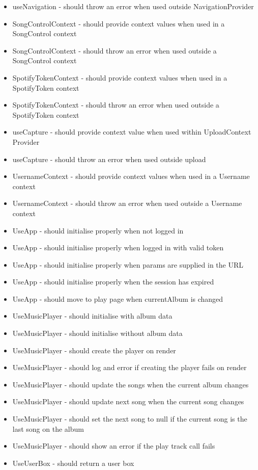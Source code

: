 \begin{multicols}{1}
\begin{itemize}
\item useNavigation - should throw an error when used outside NavigationProvider
\item SongControlContext - should provide context values when used in a SongControl context
\item SongControlContext - should throw an error when used outside a SongControl context
\item SpotifyTokenContext - should provide context values when used in a SpotifyToken context
\item SpotifyTokenContext - should throw an error when used outside a SpotifyToken context
\item useCapture - should provide context value when used within UploadContext Provider
\item useCapture - should throw an error when used outside upload
\item UsernameContext - should provide context values when used in a Username context
\item UsernameContext - should throw an error when used outside a Username context
\item UseApp - should initialise properly when not logged in
\item UseApp - should initialise properly when logged in with valid token
\item UseApp - should initialise properly when params are supplied in the URL
\item UseApp - should initialise properly when the session has expired
\item UseApp - should move to play page when currentAlbum is changed
\item UseMusicPlayer - should initialise with album data
\item UseMusicPlayer - should initialise without album data
\item UseMusicPlayer - should create the player on render
\item UseMusicPlayer - should log and error if creating the player fails on render
\item UseMusicPlayer - should update the songs when the current album changes
\item UseMusicPlayer - should update next song when the current song changes
\item UseMusicPlayer - should set the next song to null if the current song is the last song on the album
\item UseMusicPlayer - should show an error if the play track call fails
\item UseUserBox - should return a user box

\end{itemize}
\end{multicols}
